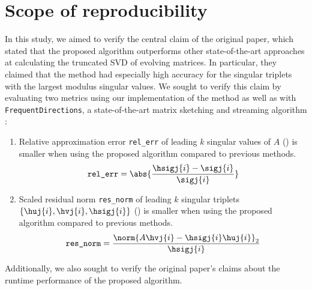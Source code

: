 \section{Scope of reproducibility} \label{sec:scope}

In this study, we aimed to verify the central claim of the original paper, which stated that the proposed algorithm outperforms other state-of-the-art approaches at calculating the truncated SVD of evolving matrices. In particular, they claimed that the method had especially high accuracy for the singular triplets with the largest modulus singular values. We sought to verify this claim by evaluating two metrics using our implementation of the method as well as with \verb|FrequentDirections|, a state-of-the-art matrix sketching and streaming algorithm \cite{Ghashami2016}:
\begin{enumerate}
    \item Relative approximation error \verb|rel_err| of leading $k$ singular values of $A$ () is smaller when using the proposed algorithm compared to previous methods.
    \begin{equation}
        \verb|rel_err| = \abs{\dfrac{\hsigj{i}-\sigj{i}}{\sigj{i}}}
        \label{eq:rel_error}
    \end{equation}
    
    \item Scaled residual norm \verb|res_norm| of leading $k$ singular triplets $\{ \huj{i}, \hvj{i}, \hsigj{i} \}$ () is smaller when using the proposed algorithm compared to previous methods.
    \begin{equation}
        \verb|res_norm| = \dfrac{\norm{A \hvj{i} - \hsigj{i} \huj{i}}_2}{\hsigj{i}}
        \label{eq:res_norm}
    \end{equation}
\end{enumerate}
Additionally, we also sought to verify the original paper's claims about the runtime performance of the proposed algorithm.
